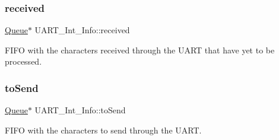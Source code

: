 \subsubsection{\texorpdfstring{received}{received}}
{\footnotesize\ttfamily \mbox{\hyperlink{struct_queue}{Queue}}$\ast$ U\+A\+R\+T\+\_\+\+Int\+\_\+\+Info\+::received}



F\+I\+FO with the characters received through the U\+A\+RT that have yet to be processed. 

\mbox{\label{group__uart_ga47efde0ca206be4c7ae8123ae7aa7b8b}} 
\subsubsection{\texorpdfstring{to\+Send}{toSend}}
{\footnotesize\ttfamily \mbox{\hyperlink{struct_queue}{Queue}}$\ast$ U\+A\+R\+T\+\_\+\+Int\+\_\+\+Info\+::to\+Send}



F\+I\+FO with the characters to send through the U\+A\+RT. 


